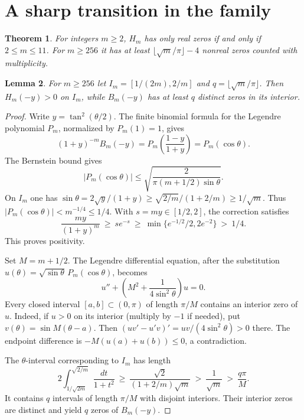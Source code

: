 \documentclass[11pt]{article}
\newtheorem{theorem}{Theorem}
\newtheorem{lemma}[theorem]{Lemma}
\begin{document}
\section{A sharp transition in the family}
\begin{theorem}\label{thm:all}
For integers $m\ge2$, $H_m$ has only real zeros if and only if $2\le m\le11$. For $m\ge256$ it has at least $\lfloor\sqrt m/\pi\rfloor-4$ nonreal zeros counted with multiplicity.
\end{theorem}

\begin{lemma}\label{lem:osc}
For $m\ge256$ let $I_m=[1/(2m),2/m]$ and $q=\lfloor\sqrt m/\pi\rfloor$. Then $H_m(-y)>0$ on $I_m$, while $B_m(-y)$ has at least $q$ distinct zeros in its interior.
\end{lemma}
\begin{proof}
Write $y=\tan^2(\theta/2)$. The finite binomial formula for the Legendre polynomial $P_m$, normalized by $P_m(1)=1$, gives \cite[Eq.~18.5.8]{dlmf}
\[
 (1+y)^{-m}B_m(-y)=P_m\!\left(\frac{1-y}{1+y}\right)=P_m(\cos\theta).
\]
The Bernstein bound \cite[Eq.~18.14.3, $\alpha=\beta=0$]{dlmf} gives
\[
 |P_m(\cos\theta)|\le\sqrt{\frac{2}{\pi(m+1/2)\sin\theta}}.
\]
On $I_m$ one has $\sin\theta=2\sqrt y/(1+y)\ge \sqrt{2/m}/(1+2/m)\ge1/\sqrt m$. Thus $|P_m(\cos\theta)|<m^{-1/4}\le1/4$. With $s=my\in[1/2,2]$, the correction satisfies
\[
   \frac{my}{(1+y)^m}\ \ge\ se^{-s}\ \ge\ \min\{e^{-1/2}/2,2e^{-2}\}\ >\ 1/4.
\]
This proves positivity.

Set $M=m+1/2$. The Legendre differential equation, after the substitution $u(\theta)=\sqrt{\sin\theta}\,P_m(\cos\theta)$, becomes
\[
 u''+\left(M^2+\frac{1}{4\sin^2\theta}\right)u=0.
\]
Every closed interval $[a,b]\subset(0,\pi)$ of length $\pi/M$ contains an interior zero of $u$. Indeed, if $u>0$ on its interior (multiply by $-1$ if needed), put $v(\theta)=\sin M(\theta-a)$. Then $(uv'-u'v)'=uv/(4\sin^2\theta)>0$ there. The endpoint difference is $-M(u(a)+u(b))\le0$, a contradiction.

The $\theta$-interval corresponding to $I_m$ has length
\[
 2\!\int_{1/\sqrt{2m}}^{\sqrt{2/m}}\!\frac{dt}{1+t^2}
 \ \ge\ \frac{\sqrt2}{(1+2/m)\sqrt m}\ >\ \frac1{\sqrt m}\ >\ \frac{q\pi}{M}.
\]
It contains $q$ intervals of length $\pi/M$ with disjoint interiors. Their interior zeros are distinct and yield $q$ zeros of $B_m(-y)$.
\end{proof}
\end{document}
